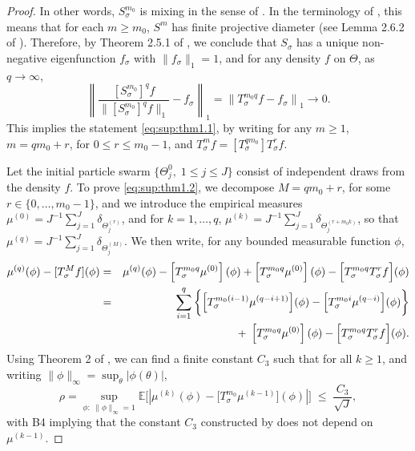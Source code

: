 \documentclass[11pt]{article}
\newcommand\Cb{C_3}
\newcommand\mZero{{m_0}}
\begin{document}
\begin{proof}
 In other words, $S_\sigma^{\mZero}$ is mixing in the sense of \cite{legland04}. In the terminology of \cite{eveson95}, this means that for each $m\geq \mZero$, $S^m$ has finite projective diameter (see Lemma 2.6.2 of \cite{eveson95}). Therefore, by Theorem 2.5.1 of \cite{eveson95}, we conclude that $S_\sigma$  has a unique non-negative eigenfunction $f_\sigma$ with $\|f_\sigma\|_1=1$, and for any density $f$ on $\Theta$, as $q\to\infty$,
\[\left\|\frac{[S_\sigma^{\mZero}]^qf}{\|[S_\sigma^{\mZero}]^qf\|_1}-f_\sigma\right\|_1=\left\|T_\sigma^{{\mZero}q}f -f_\sigma\right\|_1\to 0.\]
This implies the statement \eqref{eq:sup:thm1.1}, by writing for any $m\geq 1$, $m=q \mZero +r$, for $0\leq r\leq \mZero-1$, and $T_\sigma^m f=[T_\sigma^{q\mZero}]T_\sigma^rf$.

Let the initial particle swarm $\{\Theta^0_j,\;1\leq j\leq J\}$ consist of independent draws from the density $f$.
To prove \eqref{eq:sup:thm1.2}, we decompose $M=q\mZero +r$, for some $r\in\{0,\ldots,\mZero-1\}$, and we introduce the empirical measures $\mu^{(0)}= J^{-1}\sum_{j=1}^J\delta_{\Theta_j^{(r)}}$, and for $k=1,\ldots,q$, $\mu^{(k)}= J^{-1}\sum_{j=1}^J\delta_{\Theta_j^{(r+{\mZero}k)}}$, so that $\mu^{(q)}=J^{-1}\sum_{j=1}^J\delta_{\Theta_j^{(M)}}$. We then write, for any bounded measurable function $\phi$,
\begin{eqnarray*}
\mu^{(q)}(\phi)-[T_\sigma^Mf](\phi)&=&\mu^{(q)}(\phi)-\left[T_\sigma^{{\mZero}q}\mu^{(0)}\right](\phi) + \left[T_\sigma^{{\mZero}q}\mu^{(0)}\right](\phi) -\Big[T_\sigma^{{\mZero}q}T_\sigma^{r}f\Big](\phi)\\
&=&\sum_{i=1}^q\bigg\{\Big[T_\sigma^{{\mZero}(i-1)}\mu^{(q-i+1)}\Big](\phi)-\Big[ T_\sigma^{{\mZero}i}\mu^{(q-i)}\Big](\phi)\bigg\}
\\
& & \hspace{2cm}+ \hspace{1mm}\left[T_\sigma^{{\mZero}q}\mu^{(0)}\right](\phi) -\Big[T_\sigma^{{\mZero}q}T_\sigma^{r}f\Big](\phi).
\end{eqnarray*} 
Using Theorem 2 of \cite{crisan02}, we can find a finite constant $\Cb$ such that for all $k\geq 1$,
 and writing $\|\phi\|_\infty=\sup_\theta|\phi(\theta)|$,
\begin{equation}\label{SMC:control}
\rho=\sup_{\phi:\;\|\phi\|_\infty=1 } \mathbb{E}\bigg[\left|\mu^{(k)}(\phi)-\big[T_\sigma^{{\mZero}}\mu^{(k-1)}\big](\phi)\right|\bigg] 
\; \leq \;
\frac{\Cb}{\sqrt{J}},
\end{equation}
with B4 implying that the constant $\Cb$ constructed by \cite{crisan02} does not depend on $\mu^{(k-1)}$.

\end{proof}
\end{document}
